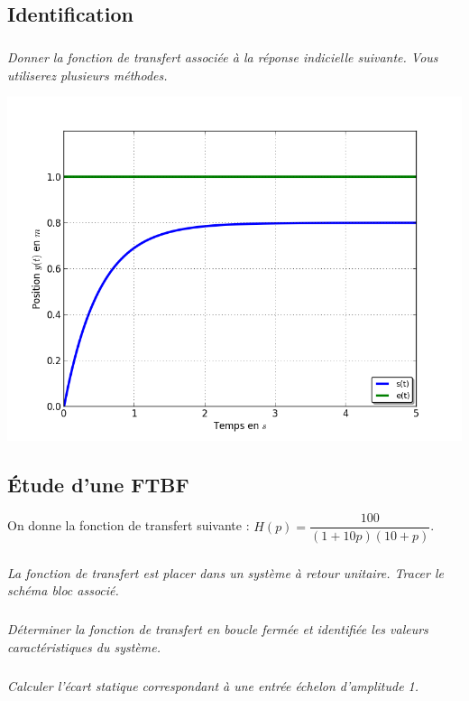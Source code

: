 \documentclass[10pt,fleqn]{article} %
\begin{document}
\begin{multicols}{2}
\subsection*{Identification}
\subparagraph*{}\textit{Donner la fonction de transfert associée à la réponse indicielle suivante. Vous utiliserez plusieurs méthodes.}

\begin{center}
\includegraphics[width=\linewidth]{images/courbe1}
\end{center} 


\subsection*{Étude d'une FTBF}
\setcounter{exo}{0}
On donne la fonction de transfert suivante : $H(p)=\dfrac{100}{\left(1+10p \right)\left(10+p \right)}$. 
\subparagraph{}
\textit{La fonction de transfert est placer dans un système à retour unitaire. Tracer le schéma bloc associé.}

\subparagraph{}
\textit{Déterminer la fonction de transfert en boucle fermée et identifiée les valeurs caractéristiques du système.}
 
\subparagraph{}
\textit{Calculer l'écart statique correspondant à une entrée échelon d'amplitude 1.}

\end{multicols}
\end{document}
